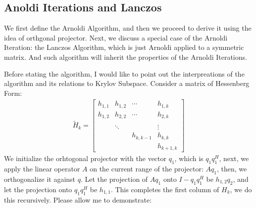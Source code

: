 \documentclass[]{article}
\theoremstyle{definition}
\begin{document}
    \subsection{Anoldi Iterations and Lanczos}
        We first define the Arnoldi Algorithm, and then we proceed to derive it using the idea of orthgonal projector. Next, we discuss a special case of the Arnoldi Iteration: the Lanczos Algorithm, which is just Arnoldi applied to a symmetric matrix. And such algorithm will inherit the properties of the Arnoldi Iterations. 
        \par
        Before stating the algorithm, I would like to point out the interpreations of the algorithm and its relations to Krylov Subspace. Consider a matrix of Hessenberg Form:
        \begin{align}
            \tilde{H}_k = 
            \begin{bmatrix}
                h_{1, 1} & h_{1, 2} & \cdots & h_{1, k} 
                \\
                h_{1, 2} & h_{2, 2} & \cdots & h_{2, k}
                \\
                \\
                & \ddots & &\vdots
                \\
                & & h_{k, k - 1}& h_{k, k}
                \\
                & & & h_{k + 1, k}
            \end{bmatrix}
        \end{align}
        We initialize the orhtogonal projector with the vector $q_1$, which is $q_1q_1^H$, next, we apply the linear operator $A$ on the current range of the projector: $Aq_1$, then, we orthogonalize it against $q$. Let the projection of $Aq_1$ onto $I - q_1q_1^H$ be $h_{1, 2}q_2$, and let the projection onto $q_1q_1^H$ be $h_{1,1}$. This completes the first column of $H_k$, we do this recursively. Please allow me to demonstrate: 
\end{document}
